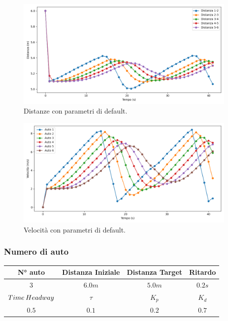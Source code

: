 \begin{figure}[H]
    \includegraphics[width=0.96\textwidth]{images/5-experiment/default/distance_6.png}
    \caption{Distanze con parametri di default.}
    \label{fig:default-distance}
\end{figure}

\begin{figure}[H]
    \includegraphics[width=0.96\textwidth]{images/5-experiment/default/velocity_6.png}
    \caption{Velocità con parametri di default.}
    \label{fig:default-velocity}
\end{figure}
\newpage


\subsubsection{Numero di auto}
\vspace*{\fill}
\begin{table}[h]
    \centering
    \begin{tabular}{|c|c|c|c|}
        \hline
        N° auto & Distanza Iniziale & Distanza Target & Ritardo \\
        \hline
        $3$ & $6.0 m$ & $5.0 m$ & $0.2 s$ \\
        \hline
        $Time\hspace{0.2em}Headway$ & $\tau$ & $K_p$ & $K_d$  \\
        \hline
        $0.5$ & $0.1$ & $0.2$ & $0.7$ \\
        \hline
    \end{tabular}
\end{table}

